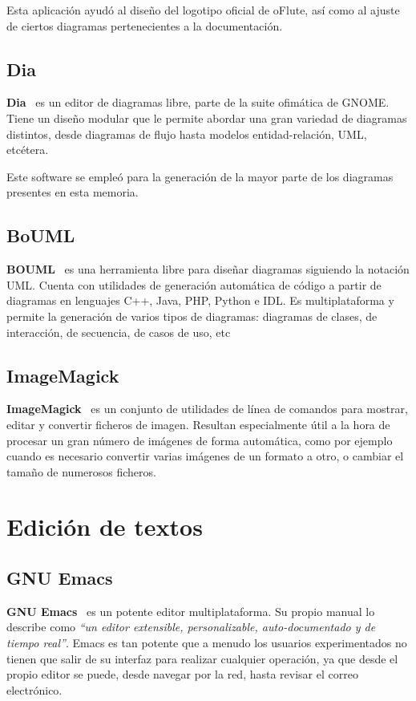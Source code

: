 Esta aplicación ayudó al diseño del logotipo oficial de oFlute, así como al
ajuste de ciertos diagramas pertenecientes a la documentación.

\subsection{Dia}
\textbf{Dia}~\cite{dia} es un editor de diagramas libre, parte de la suite ofimática de
GNOME. Tiene un diseño modular que le permite abordar una gran variedad de
diagramas distintos, desde diagramas de flujo hasta modelos entidad-relación,
UML, etcétera.

Este software se empleó para la generación de la mayor parte de los diagramas
presentes en esta memoria.

\subsection{BoUML}

\textbf{BOUML}~\cite{bouml} es una herramienta libre para diseñar diagramas siguiendo la
notación UML. Cuenta con utilidades de generación automática de código a partir
de diagramas en lenguajes C++, Java, PHP, Python e IDL. Es multiplataforma y
permite la generación de varios tipos de diagramas: diagramas de clases, de
interacción, de secuencia, de casos de uso, etc

\subsection{ImageMagick}

\textbf{ImageMagick}~\cite{imagemagick} es un conjunto de utilidades de línea de comandos para
mostrar, editar y convertir ficheros de imagen. Resultan especialmente útil a la
hora de procesar un gran número de imágenes de forma automática, como por
ejemplo cuando es necesario convertir varias imágenes de un formato a otro, o
cambiar el tamaño de numerosos ficheros.

\section{Edición de textos}

\subsection{GNU Emacs}
\textbf{GNU Emacs}~\cite{refemacs} es un potente editor multiplataforma. Su propio manual lo
describe como \textit{``un editor extensible, personalizable, auto-documentado y
  de tiempo real''}. Emacs es tan potente que a menudo los usuarios
experimentados no tienen que salir de su interfaz para realizar cualquier
operación, ya que desde el propio editor se puede, desde navegar por la red,
hasta revisar el correo electrónico.

